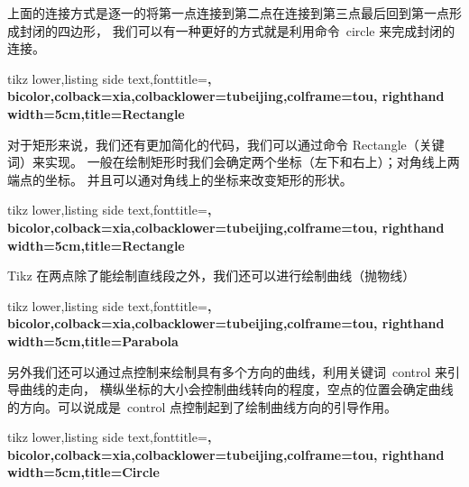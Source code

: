 \documentclass[cn,11pt, simple]{elegantbook}
\begin{document}
上面的连接方式是逐一的将第一点连接到第二点在连接到第三点最后回到第一点形成封闭的四边形，
我们可以有一种更好的方式就是利用命令~circle 来完成封闭的连接。

\begin{tcblisting}{tikz lower,listing side text,fonttitle=\bfseries,
	bicolor,colback=xia,colbacklower=tubeijing,colframe=tou,
	righthand width=5cm,title=Rectangle}
\end{tcblisting}

对于矩形来说，我们还有更加简化的代码，我们可以通过命令 Rectangle（关键词）来实现。
一般在绘制矩形时我们会确定两个坐标（左下和右上）；对角线上两端点的坐标。
并且可以通对角线上的坐标来改变矩形的形状。

\begin{tcblisting}{tikz lower,listing side text,fonttitle=\bfseries,
	bicolor,colback=xia,colbacklower=tubeijing,colframe=tou,
	righthand width=5cm,title=Rectangle}
\end{tcblisting}

Tikz 在两点除了能绘制直线段之外，我们还可以进行绘制曲线（抛物线）

\begin{tcblisting}{tikz lower,listing side text,fonttitle=\bfseries,
	bicolor,colback=xia,colbacklower=tubeijing,colframe=tou,
	righthand width=5cm,title=Parabola}
\end{tcblisting}

另外我们还可以通过点控制来绘制具有多个方向的曲线，利用关键词~control 来引导曲线的走向，
横纵坐标的大小会控制曲线转向的程度，空点的位置会确定曲线的方向。可以说成是~control
点控制起到了绘制曲线方向的引导作用。

\begin{tcblisting}{tikz lower,listing side text,fonttitle=\bfseries,
	bicolor,colback=xia,colbacklower=tubeijing,colframe=tou,
	righthand width=5cm,title=Circle}
\end{tcblisting}
\end{document}
